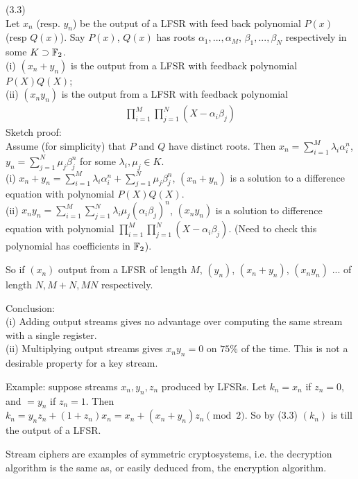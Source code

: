 \documentclass[a4paper]{article}
\begin{document}
\begin{lemma} (3.3)\\
Let $x_n$ (resp. $y_n$) be the output of a LFSR with feed back polynomial $P(x)$ (resp $Q(x)$). Say $P(x)$, $Q(x)$ has roots $\alpha_1,...,\alpha_M$, $\beta_1,...,\beta_N$ respectively in some $K \supset \mathbb{F}_2$. \\
(i) $(x_n+y_n)$ is the output from a LFSR with feedback polynomial $P(X)Q(X)$;\\
(ii) $(x_ny_n)$ is the output from a LFSR with feedback polynomial
\begin{equation*}
\begin{aligned}
\prod_{i=1}^M \prod_{j=1}^N (X-\alpha_i\beta_j)
\end{aligned}
\end{equation*}
Sketch proof:\\
Assume (for simplicity) that $P$ and $Q$ have distinct roots. Then $x_n = \sum_{i=1}^M \lambda_i \alpha_i^n$, $y_n = \sum_{j=1}^N \mu_j \beta_j^n$ for some $\lambda_i,\mu_j \in K$.\\
(i) $x_n + y_n = \sum_{i=1}^M \lambda_i\alpha_i^n + \sum_{j=1}^N \mu_j \beta_j^n$, $(x_n+y_n)$ is a solution to a difference equation with polynomial $P(X)Q(X)$.\\
(ii) $x_ny_n = \sum_{i=1}^M \sum_{j=1}^N \lambda_i \mu_j (\alpha_i\beta_j)^n$, $(x_n y_n)$ is a solution to difference equation with polynomial $\prod_{i=1}^M \prod_{j=1}^N (X-\alpha_i\beta_j)$. (Need to check this polynomial has coefficients in $\mathbb{F}_2$).

So if $(x_n)$ output from a LFSR of length $M$, $(y_n)$, $(x_n+y_n)$, $(x_ny_n)$ ... of length $N,M+N,MN$ respectively.

Conclusion:\\
(i) Adding output streams gives no advantage over computing the same stream with a single register.\\
(ii) Multiplying output streams gives $x_ny_n=0$ on $75\%$ of the time. This is not a desirable property for a key stream.
\end{lemma}

Example: suppose streams $x_n,y_n,z_n$ produced by LFSRs. Let $k_n=x_n$ if $z_n=0$, and $=y_n$ if $z_n=1$. Then $k_n = y_nz_n + (1+z_n) x_n = x_n + (x_n+y_n)z_n \pmod 2$. So by (3.3) $(k_n)$ is till the output of a LFSR.

Stream ciphers are examples of symmetric cryptosystems, i.e. the decryption algorithm is the same as, or easily deduced from, the encryption algorithm.
\end{document}
